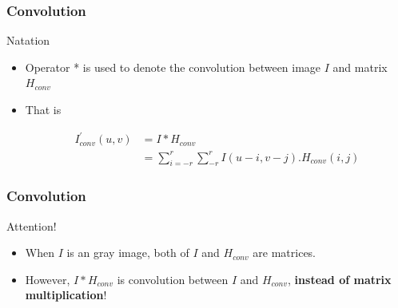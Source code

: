 \documentclass[english,11pt,table,handout]{beamer}
\begin{document}
\frame
{
	\frametitle{Convolution}
	
	\begin{block}{Natation}
		\begin{itemize}
			\item \alert{Operator *} is used to denote the convolution between image $I$ and matrix $H_{conv}$
			\item That is
			
			\begin{equation*} 
			\begin{split}
			I_{conv}^{'}{(u,v)} &= I * H_{conv} \\
				&= \sum_{i=-r}^{r}{\sum_{-r}^{r}{I(u-i, v-j).H_{conv}{(i,j)}}}
			\end{split}
			\end{equation*}
		\end{itemize}
		
		
	\end{block}
}
\frame
{
	\frametitle{Convolution}
	
	\begin{alertblock}{Attention!}
		\begin{itemize}
			\item When $I$ is an gray image, both of $I$ and $H_{conv}$ are matrices.
			\item However,  $I * H_{conv}$ is convolution between $I$ and $H_{conv}$, \textbf{instead of matrix multiplication}!
	
	\end{itemize}
	
	
	\end{alertblock}
}
\end{document}
